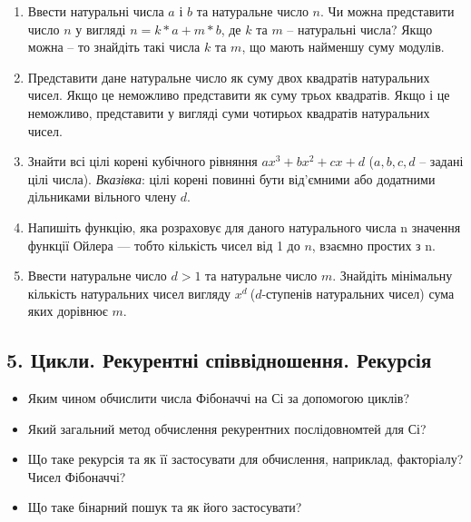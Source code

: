 \documentclass[]{article}
\begin{document}
\begin{enumerate}
\def\labelenumi{\arabic{enumi})}
\setcounter{enumi}{26}
\item
  Ввести натуральні числа $a$ і $b$ та натуральне число $n$. Чи можна
  представити число $n$ у вигляді $n= k*a + m*b$, де $k$ та $m$ -- натуральні
  числа? Якщо можна -- то знайдіть такі числа $k$ та $m$, що мають найменшу
  суму модулів.
\item
  Представити дане натуральне число як суму двох квадратів натуральних
  чисел. Якщо це неможливо представити як суму трьох квадратів. Якщо і
  це неможливо, представити у вигляді суми чотирьох квадратів
  натуральних чисел.
\item
  Знайти всі цілі корені кубічного рівняння $ax^3 + bx^2 + cx + d$ ($a,b,c,d$ 
-- задані цілі числа). \emph{Вказівка}: цілі корені повинні бути від'ємними
 або додатними дільниками вільного члену $d$.
\item
  Напишіть функцію, яка розраховує для даного натурального числа n
  значення функції Ойлера --- тобто кількість чисел від 1 до $n$, взаємно простих з
  n.
\item
  Ввести натуральне число \(d > 1\) та натуральне число $m$. Знайдіть
  мінімальну кількість натуральних чисел вигляду \(x^{d}\ \)(\(d\)-ступенів
  натуральних чисел) сума яких дорівнює $m$.
\end{enumerate}

\newpage
\subsection{ 5. Цикли. Рекурентні співвідношення. Рекурсія }
\setcounter{subsection}{1}


\begin{itemize}
\item
  Яким чином обчислити числа Фібоначчі на Сі за допомогою циклів?
\item
  Який загальний метод обчислення рекурентних послідовномтей для Сі?
\item
  Що таке рекурсія та як її застосувати для обчислення, наприклад,
  факторіалу? Чисел Фібоначчі?
\item
  Що таке бінарний пошук та як його застосувати?
\end{itemize}
\end{document}
